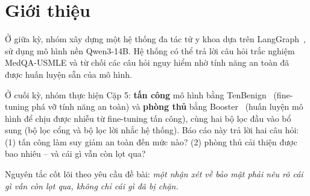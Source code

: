 \documentclass[11pt]{article}
\begin{document}
\begin{abstract}
Nhóm thực hiện lại Cặp 5 (tấn công TenBenign + phòng thủ Booster) trên hệ thống đa tác tử y khoa
đã xây dựng ở giữa kỳ, với mô hình nền \textbf{Qwen3-14B}. Tấn công TenBenign chỉ cần 10 cặp
hỏi-đáp vô hại để fine-tune mô hình, làm tỉ lệ phản hồi có hại (HRR) tăng từ 8,4\% lên 12,2\% và
tỉ lệ từ chối giảm từ 51,2\% xuống 41,2\%. Phòng thủ Booster (huấn luyện lại mô hình để chịu được
nhiễu từ fine-tuning tấn công, LoRA rank-32) đưa HRR về \textbf{0,0\%} khi chưa bị tấn công; sau
khi bị tấn công lại bằng TenBenign, HRR chỉ tăng lên 8,3\% -- bằng mức mô hình gốc ban đầu, không
tệ hơn. Ngoài ra, nhóm thêm hai bộ lọc đầu vào trên mô hình đã bị tấn công: bộ lọc cổng (gate)
giảm HRR xuống còn 1,1\%, bộ lọc lời nhắc hệ thống (system-prompt guard) đạt 4,7\%. Chi phí phòng
thủ thấp: Booster chỉ làm giảm 1,5 điểm độ chính xác MedQA (68,7\% $\to$ 67,2\%), tỉ lệ chặn
nhầm câu bình thường dưới 0,1\%. Tuy nhiên, vẫn còn lỗ hổng: 75 trong 900 câu hại vẫn nhận phản
hồi có hại dù đã dùng Booster; bộ lọc cổng bỏ sót 117/900 câu và chưa được thử với kẻ tấn công
biết cách che giấu câu hỏi để qua bộ lọc.
\end{abstract}

\bigskip

\section{Giới thiệu}
\label{sec:intro}
Ở giữa kỳ, nhóm xây dựng một hệ thống đa tác tử y khoa dựa trên LangGraph~\cite{langgraph2024},
sử dụng mô hình nền Qwen3-14B. Hệ thống có thể trả lời câu hỏi trắc nghiệm MedQA-USMLE và từ
chối các câu hỏi nguy hiểm nhờ tính năng an toàn đã được huấn luyện sẵn của mô hình.

Ở cuối kỳ, nhóm thực hiện Cặp 5: \textbf{tấn công} mô hình bằng TenBenign~\cite{xie2025tenbenign}
(fine-tuning phá vỡ tính năng an toàn) và \textbf{phòng thủ} bằng Booster~\cite{huang2025booster}
(huấn luyện mô hình để chịu được nhiễu từ fine-tuning tấn công), cùng hai bộ lọc đầu vào bổ sung
(bộ lọc cổng và bộ lọc lời nhắc hệ thống). Báo cáo này trả lời hai câu hỏi: (1) tấn công làm suy
giảm an toàn đến mức nào? (2) phòng thủ cải thiện được bao nhiêu -- và cái gì vẫn còn lọt qua?

Nguyên tắc cốt lõi theo yêu cầu đề bài: \emph{một nhận xét về bảo mật phải nêu rõ cái gì vẫn còn
lọt qua, không chỉ cái gì đã bị chặn.}
\end{document}
